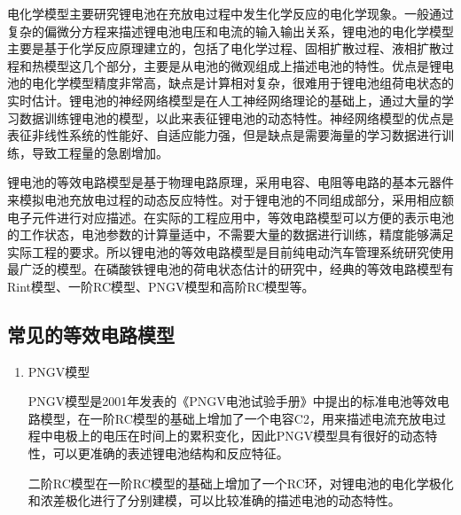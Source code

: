 电化学模型主要研究锂电池在充放电过程中发生化学反应的电化学现象。一般通过复杂的偏微分方程来描述锂电池电压和电流的输入输出关系，锂电池的电化学模型主要是基于化学反应原理建立的，包括了电化学过程、固相扩散过程、液相扩散过程和热模型这几个部分，主要是从电池的微观组成上描述电池的特性。优点是锂电池的电化学模型精度非常高，缺点是计算相对复杂，很难用于锂电池组荷电状态的实时估计。锂电池的神经网络模型是在人工神经网络理论的基础上，通过大量的学习数据训练锂电池的模型，以此来表征锂电池的动态特性。神经网络模型的优点是表征非线性系统的性能好、自适应能力强，但是缺点是需要海量的学习数据进行训练，导致工程量的急剧增加。

锂电池的等效电路模型是基于物理电路原理，采用电容、电阻等电路的基本元器件来模拟电池充放电过程的动态反应特性。对于锂电池的不同组成部分，采用相应额电子元件进行对应描述。在实际的工程应用中，等效电路模型可以方便的表示电池的工作状态，电池参数的计算量适中，不需要大量的数据进行训练，精度能够满足实际工程的要求。所以锂电池的等效电路模型是目前纯电动汽车管理系统研究使用最广泛的模型。在磷酸铁锂电池的荷电状态估计的研究中，经典的等效电路模型有Rint模型、一阶RC模型、PNGV模型和高阶RC模型等。
\subsection{常见的等效电路模型}
\begin{enumerate}

一阶RC模型由一个RC并联电路、一个恒定电阻R2和一个电压源Voc组成。在电路模型中R2代表的是锂电池的欧姆内阻，R1代表电池的极化内阻，电压源Voc代表电池的开路电压。一阶RC模型对锂电池的极化特性进行了描述，可以比较准确的描述锂电池的动态特性，结构也比较简单。
\item PNGV模型

PNGV模型是2001年发表的《PNGV电池试验手册》中提出的标准电池等效电路模型，在一阶RC模型的基础上增加了一个电容C2，用来描述电流充放电过程中电极上的电压在时间上的累积变化，因此PNGV模型具有很好的动态特性，可以更准确的表述锂电池结构和反应特征。

二阶RC模型在一阶RC模型的基础上增加了一个RC环，对锂电池的电化学极化和浓差极化进行了分别建模，可以比较准确的描述电池的动态特性。
\end{enumerate}
